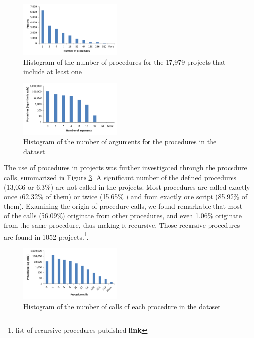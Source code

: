 \documentclass{sig-alternate}
\newcommand{\todo}[1]{\textbf{#1}}
\begin{document}
\begin{figure}
	\centering
	\includegraphics[width=0.45\textwidth]{fig/charts/6proceduresperproject}
	\caption{Histogram of the number of procedures for the 17,979 projects that include at least one}
	\label{fig:proceduresperproject}
\end{figure}

\begin{figure}
	\centering
	\includegraphics[width=0.45\textwidth]{fig/charts/5arguments}
	\caption{Histogram of the number of arguments for the procedures in the dataset}
	\label{fig:procedurearguments}
\end{figure}

The use of procedures in projects was further investigated through the procedure calls, summarized in Figure \ref{fig:procedurecalls}. A significant number of the defined procedures (13,036 or 6.3\%) are not called in the projects. Most procedures are called exactly once (62.32\% of them) or twice (15.65\% ) and from exactly one script (85.92\% of them). Examining the origin of procedure calls, we found remarkable that most of the calls (56.09\%) originate from other procedures, and even 1.06\% originate from the same procedure, thus making it recursive. Those recursive procedures are found in 1052 projects.\footnote{list of recursive procedures published \todo{link}}.

\begin{figure}
	\centering
	\includegraphics[width=0.45\textwidth]{fig/charts/7procedurecalls}
	\caption{Histogram of the number of calls of each procedure in the dataset}
	\label{fig:procedurecalls}
\end{figure}
\end{document}

